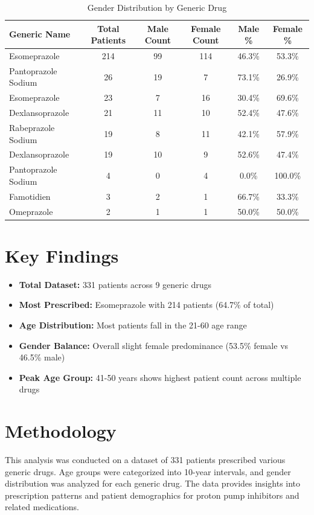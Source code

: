 \documentclass[10pt]{article}
\begin{document}
\begin{table}[h!]
\centering
\caption{Gender Distribution by Generic Drug}
\label{tab:gender_distribution}
\begin{tabular}{l|c|c|c|c|c}
\toprule
\rowcolor{headercolor}
\textbf{Generic Name} & \textbf{Total Patients} & \textbf{Male Count} & \textbf{Female Count} & \textbf{Male \%} & \textbf{Female \%} \\
\midrule
Esomeprazole & 214 & 99 & 114 & 46.3\% & 53.3\% \\
\rowcolor{altrowcolor}
Pantoprazole Sodium & 26 & 19 & 7 & 73.1\% & 26.9\% \\
Esomeprazole & 23 & 7 & 16 & 30.4\% & 69.6\% \\
\rowcolor{altrowcolor}
Dexlansoprazole & 21 & 11 & 10 & 52.4\% & 47.6\% \\
Rabeprazole Sodium & 19 & 8 & 11 & 42.1\% & 57.9\% \\
\rowcolor{altrowcolor}
Dexlansoprazole & 19 & 10 & 9 & 52.6\% & 47.4\% \\
Pantoprazole Sodium & 4 & 0 & 4 & 0.0\% & 100.0\% \\
\rowcolor{altrowcolor}
Famotidien & 3 & 2 & 1 & 66.7\% & 33.3\% \\
Omeprazole & 2 & 1 & 1 & 50.0\% & 50.0\% \\
\bottomrule
\end{tabular}
\end{table}

\section{Key Findings}

\begin{itemize}
\item \textbf{Total Dataset:} 331 patients across 9 generic drugs
\item \textbf{Most Prescribed:} Esomeprazole with 214 patients (64.7\% of total)
\item \textbf{Age Distribution:} Most patients fall in the 21-60 age range
\item \textbf{Gender Balance:} Overall slight female predominance (53.5\% female vs 46.5\% male)
\item \textbf{Peak Age Group:} 41-50 years shows highest patient count across multiple drugs
\end{itemize}

\section{Methodology}

This analysis was conducted on a dataset of 331 patients prescribed various generic drugs. Age groups were categorized into 10-year intervals, and gender distribution was analyzed for each generic drug. The data provides insights into prescription patterns and patient demographics for proton pump inhibitors and related medications.
\end{document}
